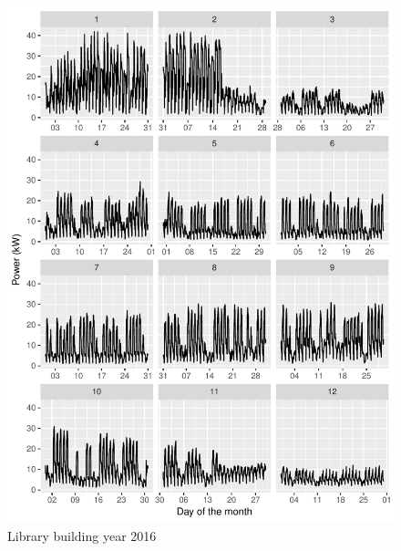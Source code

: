 \documentclass[11pt, oneside]{article}   	%
\begin{document}
\begin{figure}
\includegraphics[keepaspectratio]{library_build_Y2016.pdf}
\caption{Library building year 2016 }
\end{figure}
\end{document}
